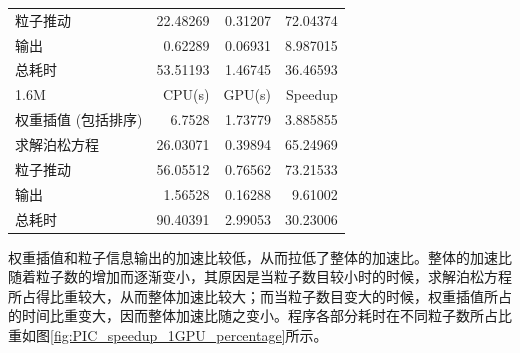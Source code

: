 \begin{table}
\begin{tabular}{|l|r|r|r|}
    粒子推动            &    22.48269	  &     0.31207	  &  72.04374   \\
    输出                   &    0.62289     &     0.06931   &  8.987015   \\
    总耗时               &    53.51193    &     1.46745   &  36.46593   \\
    \hline
    1.6M                     &    CPU(s)      &     GPU(s)    &  Speedup    \\
    \hline
    权重插值 (包括排序) &    6.7528      &     1.73779   &  3.885855   \\
    求解泊松方程           &    26.03071    &     0.39894   &  65.24969   \\
    粒子推动            &    56.05512	  &     0.76562	  &  73.21533   \\
    输出                   &    1.56528     &     0.16288   &  9.61002    \\
    总耗时               &    90.40391    &     2.99053   &  30.23006   \\
    \hline
  \end{tabular}
  \label{tab:PIC_speedup_1GPU}
\end{table}

权重插值和粒子信息输出的加速比较低，从而拉低了整体的加速比。整体的加速比随着粒子数的增加而逐渐变小，其原因是当粒子数目较小时的时候，求解泊松方程所占得比重较大，从而整体加速比较大；而当粒子数目变大的时候，权重插值所占的时间比重变大，因而整体加速比随之变小。程序各部分耗时在不同粒子数所占比重如图\eqref{fig:PIC_speedup_1GPU_percentage}所示。


